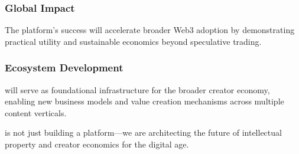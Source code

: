 \subsubsection{Global Impact}

The platform's success will accelerate broader Web3 adoption by demonstrating practical utility and sustainable economics beyond speculative trading.

\subsubsection{Ecosystem Development}

\storyhouse{} will serve as foundational infrastructure for the broader creator economy, enabling new business models and value creation mechanisms across multiple content verticals.

\begin{keypoint}
\storyhouse{} is not just building a platform—we are architecting the future of intellectual property and creator economics for the digital age.
\end{keypoint}
